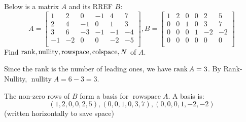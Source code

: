 \documentclass{article}
\DeclareMathOperator{\nullity}{nullity}
\DeclareMathOperator{\colspace}{colspace}
\DeclareMathOperator{\rowspace}{rowspace}
\begin{document}
\begin{example}
  Below is a matrix $A$ and its RREF $B$:
  \[
    A =
    \begin{bmatrix}
      1 & 2 & 0 & -1 & 4 & 7\\
      2 & 4 & -1 & 0 & 1 & 3\\
      3 & 6 & -3 & -1 & -1 & -4\\
      -1 & -2 & 0 & 0 & -2 & -5\\
    \end{bmatrix}, B =
    \begin{bmatrix}
      1 & 2 & 0 & 0 & 2 & 5\\
      0 & 0 & 1 & 0 & 3 & 7\\
      0 & 0 & 0 & 1 & -2 & -2\\
      0 & 0 & 0 & 0 & 0 & 0\\
    \end{bmatrix}
  \]
  Find $\rank, \nullity, \rowspace, \colspace, N$ of $A$.

  Since the rank is the number of leading ones, we have $\rank A = 3$. By Rank-Nullity, $\nullity A = 6 - 3 = 3$.

  The non-zero rows of $B$ form a basis for $\rowspace A$. A basis is:
  \[
    (1, 2, 0, 0, 2 , 5), (0, 0, 1, 0, 3, 7), (0, 0, 0, 1, -2, -2)
  \]
  (written horizontally to save space)


\end{example}
\end{document}
